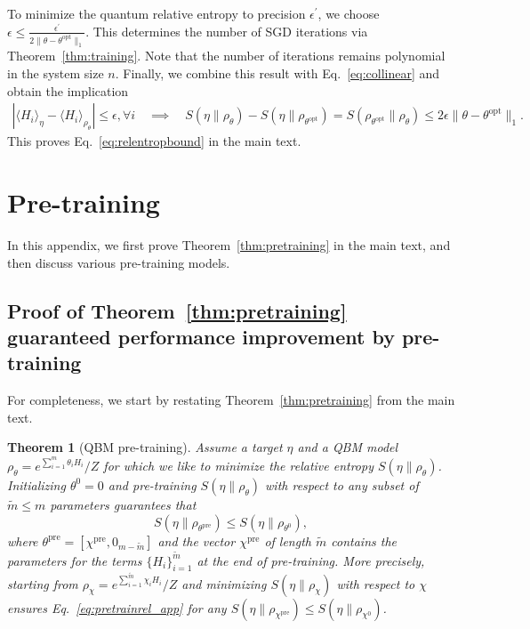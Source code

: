 \documentclass[
    aps,
    prx,
    floatfix,
    nofootinbib,
    onecolumn
]{revtex4-2}
\newtheorem{theorem}{Theorem}
\begin{document}
To minimize the quantum relative entropy to precision $\epsilon^\prime$, we choose $\epsilon \leq \frac{\epsilon^\prime}{ 2 \| \theta - \theta^\textrm{opt} \|_1 }$. This determines the number of SGD iterations via Theorem~\ref{thm:training}. Note that the number of iterations remains polynomial in the system size $n$. Finally, we combine this result with Eq.~\eqref{eq:collinear} and obtain the implication
\begin{align}
    |\langle H_{i}\rangle_\eta -\langle H_{i} \rangle_{\rho_\theta} | \leq \epsilon, \forall i \quad \implies \quad S(\eta \| \rho_{\theta}) - S(\eta \| \rho_{\theta^\mathrm{opt}}) = S(\rho_{\theta^\mathrm{opt}} \| \rho_{\theta}) \leq 2 \epsilon \| \theta - \theta^\textrm{opt} \|_1 .
\end{align} 
This proves Eq.~\eqref{eq:relentropbound} in the main text. 


\section{Pre-training}


In this appendix, we first prove Theorem~\ref{thm:pretraining} in the main text, and then discuss various pre-training models. 

\subsection{Proof of Theorem~\ref{thm:pretraining} guaranteed performance improvement by pre-training}
\label{app:pretrainthm}
For completeness, we start by restating Theorem~\ref{thm:pretraining} from the main text. 

\begingroup
\def\thetheorem{3}
\begin{theorem}[QBM pre-training]
    Assume a target $\eta$ and a QBM model $\rho_\theta=e^{\sum_{i=1}^m \theta_i H_i}/Z$ for which we like to minimize the relative entropy $S(\eta \|\rho_\theta)$. Initializing $\theta^0=0$ and pre-training $S(\eta\| \rho_\theta)$ with respect to any subset of $\tilde{m} \leq m $ parameters guarantees that 
    \begin{equation}
    \label{eq:pretrainrel_app}
         S(\eta \|\rho_{\theta^\mathrm{pre}}) \leq S(\eta \|\rho_{\theta^0}), 
    \end{equation} 
    where $\theta^\mathrm{pre} = [\chi^{\mathrm{pre}}, 0_{m-\tilde{m}}]$ and the vector $\chi^{\mathrm{pre}}$ of length $\tilde{m}$ contains the parameters for the terms $\{H_i\}_{i=1}^{\tilde{m}}$ at the end of pre-training.
    More precisely, starting from $\rho_\chi=e^{\sum_{i=1}^{\tilde{m}} \chi_i H_i}/Z$ and minimizing $S(\eta \|\rho_\chi)$ with respect to $\chi$ ensures Eq.~\eqref{eq:pretrainrel_app} for any $S(\eta \|\rho_{\chi^{\mathrm{pre}}})\leq S(\eta \|\rho_{\chi^0})$.
\end{theorem}
\endgroup
\end{document}

